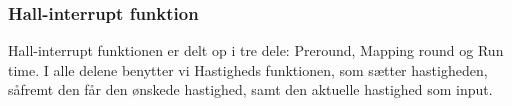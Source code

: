 \subsubsection{Hall-interrupt funktion}
\label{Hall-funktion}

Hall-interrupt funktionen er delt op i tre dele: Preround, Mapping round og Run time. I alle delene benytter vi Hastigheds funktionen, som sætter hastigheden, såfremt den får den ønskede hastighed, samt den aktuelle hastighed som input.

